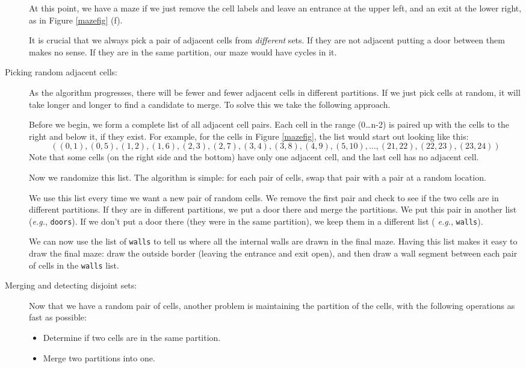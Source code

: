 \documentclass{article}
\begin{document}
\begin{description}
At this point, we have a maze if we just remove the cell labels
and leave an entrance at the upper left, and an
exit at the lower right, as in Figure \ref{mazefig} (f).
  
It is crucial that we always pick a pair of adjacent cells from {\em
  different} sets.  If they are not adjacent putting a door between
them makes no sense.  If they are in the same partition, our maze
would have cycles in it.


\item[Picking random adjacent cells:] As the algorithm progresses,
  there will be fewer and fewer adjacent cells in different
  partitions.  If we just pick cells at random, it will take longer
  and longer to find a candidate to merge.  To solve this we take the
  following approach.

  Before we begin, we form a complete list of all adjacent cell pairs.
  Each cell in the range (0\ldots n-2) is paired up with the cells to
  the right and below it, if they exist.  For example, for the cells
  in Figure \ref{mazefig}, the list would start out looking like this:
  \[
  ((0,1), (0,5), (1,2), (1,6), (2,3), (2,7), (3,4), (3,8), (4,9),
  (5,10), \ldots, (21,22), (22,23), (23,24) )
  \]
  Note that some cells (on the right side and the bottom) have only
  one adjacent cell, and the last cell has no adjacent cell.

  Now we randomize this list.  The algorithm is simple:  for each
  pair of cells, swap that pair with a pair at a random location.

  We use this list every time we want a new pair of random cells.  We
  remove the first pair and check to see if the two cells are in
  different partitions.  If they are in different partitions, we put a
  door there and merge the partitions.  We put this pair in another
  list ({\em e.g.}, {\tt doors}).  If we don't put a door there (they were
  in the same partition), we keep them in a different list ({\em
    e.g.}, {\tt walls}).

  We can now use the list of {\tt walls} to tell us where all the
  internal walls are drawn in the final maze.  Having this list makes
  it easy to draw the final maze: draw the outside border (leaving the
  entrance and exit open), and then draw a wall segment between each
  pair of cells in the {\tt walls} list.

\item[Merging  and detecting disjoint sets:]
  
Now that we have a random pair of cells, another problem is maintaining
the partition of the cells, with the following operations as fast as
possible: 
  \begin{itemize}
  \item Determine if two cells are in the same partition.
    \item Merge two partitions into one.
  \end{itemize}


\end{description}
\end{document}
